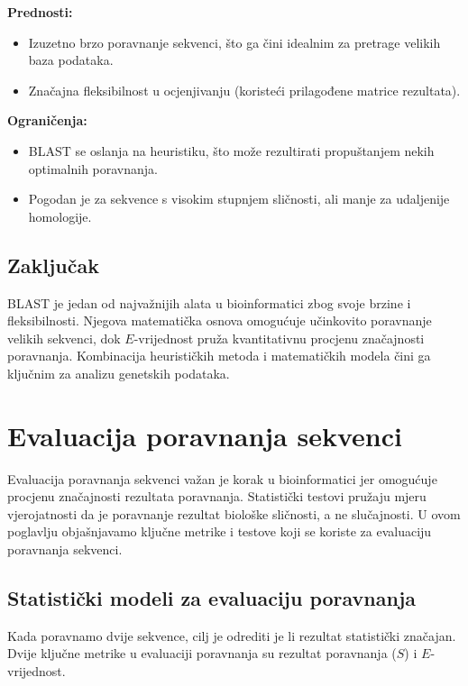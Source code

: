 \documentclass[10pt,a4paper,twoside]{article}
\begin{document}
\textbf{Prednosti:}
\begin{itemize}
	\item Izuzetno brzo poravnanje sekvenci, što ga čini idealnim za pretrage velikih baza podataka.
	\item Značajna fleksibilnost u ocjenjivanju (koristeći prilagođene matrice rezultata).
\end{itemize}

\textbf{Ograničenja:}
\begin{itemize}
	\item BLAST se oslanja na heuristiku, što može rezultirati propuštanjem nekih optimalnih poravnanja.
	\item Pogodan je za sekvence s visokim stupnjem sličnosti, ali manje za udaljenije homologije.
\end{itemize}


\subsection*{Zaključak}

BLAST je jedan od najvažnijih alata u bioinformatici zbog svoje brzine i fleksibilnosti. Njegova matematička osnova omogućuje učinkovito poravnanje velikih sekvenci, dok \( E \)-vrijednost pruža kvantitativnu procjenu značajnosti poravnanja. Kombinacija heurističkih metoda i matematičkih modela čini ga ključnim za analizu genetskih podataka.
	
\section*{Evaluacija poravnanja sekvenci}

Evaluacija poravnanja sekvenci važan je korak u bioinformatici jer omogućuje procjenu značajnosti rezultata poravnanja. Statistički testovi pružaju mjeru vjerojatnosti da je poravnanje rezultat biološke sličnosti, a ne slučajnosti. U ovom poglavlju objašnjavamo ključne metrike i testove koji se koriste za evaluaciju poravnanja sekvenci.

\subsection*{Statistički modeli za evaluaciju poravnanja}

Kada poravnamo dvije sekvence, cilj je odrediti je li rezultat statistički značajan. Dvije ključne metrike u evaluaciji poravnanja su rezultat poravnanja (\( S \)) i \( E \)-vrijednost.
\end{document}
